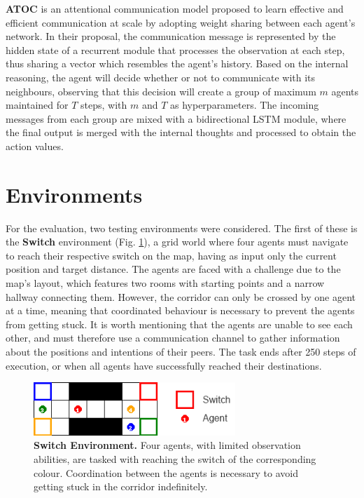 \documentclass[a4paper,singleside,12pt]{report} %
\begin{document}
\textbf{ATOC}\cite{Jiang2018LearningAC} is an attentional communication model proposed to learn effective and efficient communication at scale by adopting weight sharing between each agent's network. In their proposal, the communication message is represented by the hidden state of a recurrent module that processes the observation at each step, thus sharing a vector which resembles the agent's history. Based on the internal reasoning, the agent will decide whether or not to communicate with its neighbours, observing that this decision will create a group of maximum $m$ agents maintained for $T$ steps, with $m$ and $T$ as hyperparameters. The incoming messages from each group are mixed with a bidirectional LSTM module, where the final output is merged with the internal thoughts and processed to obtain the action values.
 
\section{Environments}\label{Environments}
For the evaluation, two testing environments were considered. The first of these is the \textbf{Switch} environment (Fig. \ref{fig:switch}), a grid world where four agents must navigate to reach their respective switch on the map, having as input only the current position and target distance. The agents are faced with a challenge due to the map's layout, which features two rooms with starting points and a narrow hallway connecting them. However, the corridor can only be crossed by one agent at a time, meaning that coordinated behaviour is necessary to prevent the agents from getting stuck. It is worth mentioning that the agents are unable to see each other, and must therefore use a communication channel to gather information about the positions and intentions of their peers. The task ends after 250 steps of execution, or when all agents have successfully reached their destinations. 

\begin{figure}
  \centering
  \includegraphics[height=2cm]{images/switch.png}
  \caption{\textbf{Switch Environment.} Four agents, with limited observation abilities, are tasked with reaching the switch of the corresponding colour. Coordination between the agents is necessary to avoid getting stuck in the corridor indefinitely.}
  \label{fig:switch}
\end{figure}
\end{document}
